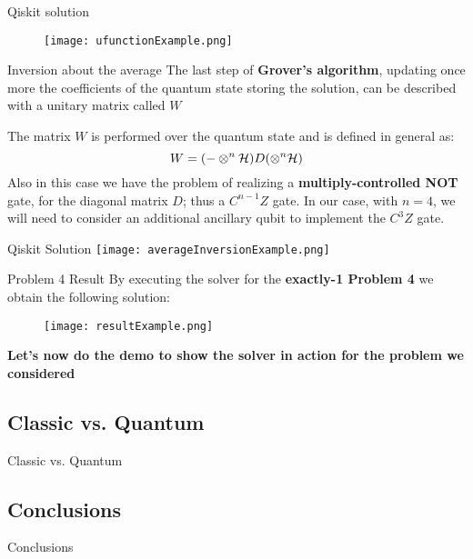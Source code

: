 		\begin{frame}{Qiskit solution}
			\begin{figure}
				\vspace{-1cm}
				\centering
				\texttt{[image: ufunctionExample.png]}
			\end{figure}
		\end{frame}
	
		\begin{frame}{Inversion about the average}
			The last step of \textbf{Grover's algorithm}, updating once more the coefficients of the quantum state storing the solution, can be described with a unitary matrix called $W$\\
			
			\vspace{0.2cm}
			
			The matrix $W$ is performed over the quantum state and is defined in general as:
			\begin{equation*}
				\centering
				W = (-\otimes^n\mathcal{H})D(\otimes^n\mathcal{H})
			\end{equation*}
			Also in this case we have the problem of realizing a \textbf{multiply-controlled NOT} gate, for the diagonal matrix $D$; thus a $C^{n-1}Z$ gate. In our case, with $n=4$, we will need to consider an additional ancillary qubit to implement the $C^3Z$ gate.
		\end{frame}
	
		\begin{frame}{Qiskit Solution}
			\vspace{-0.8cm}
			\centering
			\texttt{[image: averageInversionExample.png]}
		\end{frame}
	
		\begin{frame}{Problem 4 Result}
			By executing the solver for the \textbf{exactly-1 Problem 4} we obtain the following solution:
			\begin{figure}[h]
				\vspace{-0.2cm}
				\centering
				\texttt{[image: resultExample.png]}
				\vspace{-0.3cm}
			\end{figure}
			\textbf{Let's now do the demo to show the solver in action for the problem we considered}
		\end{frame}
	
	\subsection{Classic vs. Quantum}
		\begin{frame}{Classic vs. Quantum}
		
		\end{frame}
		
	\subsection{Conclusions}
		\begin{frame}{Conclusions}
		
		\end{frame}
		
	